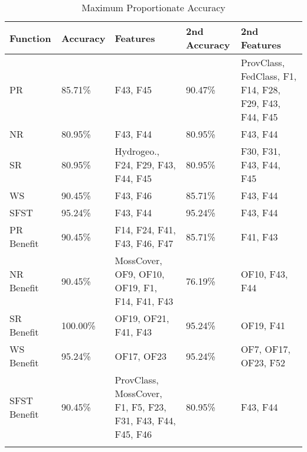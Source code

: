 \begin{longtable}{|p{3cm}|p{2cm}|p{3cm}|p{2cm}|p{3cm}|}
\hline
\textbf{Function} & \textbf{Accuracy} &  \textbf{ Features} & \textbf{2nd Accuracy} &  \textbf{2nd Features}\\ \hline
PR & 85.71\% & F43, F45 & 90.47\% & ProvClass, FedClass, F1, F14, F28, F29, F43, F44, F45  \\ \hline
NR & 80.95\% &  F43, F44 & 80.95\% &  F43, F44 \\ \hline
SR & 80.95\% & Hydrogeo., F24, F29, F43, F44, F45 & 80.95\% & F30, F31, F43, F44, F45\\ \hline
WS & 90.45\% & F43, F46 & 85.71\% & F43, F44 \\ \hline
SFST & 95.24\% & F43, F44 & 95.24\% & F43, F44 \\ \hline
PR Benefit & 90.45\% & F14, F24, F41, F43, F46, F47 &  85.71\% & F41, F43 \\ \hline
NR Benefit & 90.45\% & MossCover, OF9, OF10, OF19, F1, F14, F41, F43 & 76.19\% & OF10, F43, F44 \\ \hline
SR Benefit & 100.00\% & OF19, OF21, F41, F43 & 95.24\% & OF19, F41\\ \hline
WS Benefit & 95.24\% & OF17, OF23 & 95.24\% & OF7, OF17, OF23, F52 \\ \hline
SFST Benefit& 90.45\% & ProvClass, MossCover, F1, F5, F23, F31, F43, F44, F45, F46 & 80.95\% & F43, F44 \\ \hline
\caption{Maximum Proportionate Accuracy}
\label{tab_class_all:featred_small}
\end{longtable}
